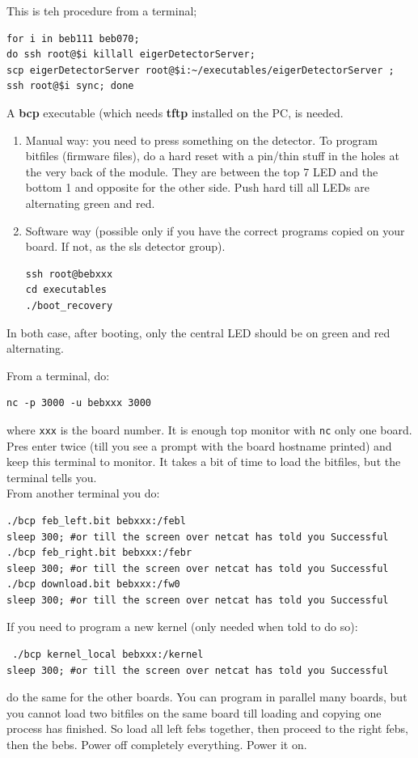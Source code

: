 \documentclass{article}
\begin{document}
This is teh procedure from a terminal;
\begin{verbatim}
for i in beb111 beb070; 
do ssh root@$i killall eigerDetectorServer; 
scp eigerDetectorServer root@$i:~/executables/eigerDetectorServer ; 
ssh root@$i sync; done
\end{verbatim}

A \textbf{bcp} executable (which needs \textbf{tftp} installed on the PC, is needed. 
\begin{enumerate}
\item Manual way: you need to press something on the detector. To program bitfiles (firmware files), do a hard reset with a pin/thin stuff in the holes at the very back of the module. They are between the top 7 LED and the bottom 1 and opposite for the other side. Push hard till all LEDs are alternating green and red.
\item Software way (possible only if you have the correct programs copied on your board. If not, as the sls detector group). 
\begin{verbatim}
ssh root@bebxxx
cd executables
./boot_recovery 
 \end{verbatim} 
\end{enumerate}
In both case, after booting, only the central LED should be on green and red alternating. 

From a terminal, do:
\begin{verbatim}
nc -p 3000 -u bebxxx 3000 
\end{verbatim} 
where {\tt{xxx}} is the board number. It is enough top monitor with {\tt{nc}} only one board. Pres enter twice (till you see a prompt with the board hostname printed) and keep this terminal to monitor. It takes a bit of time to load the bitfiles, but the terminal tells you.\\
From another terminal you do:
\begin{verbatim}
./bcp feb_left.bit bebxxx:/febl
sleep 300; #or till the screen over netcat has told you Successful
./bcp feb_right.bit bebxxx:/febr
sleep 300; #or till the screen over netcat has told you Successful
./bcp download.bit bebxxx:/fw0
sleep 300; #or till the screen over netcat has told you Successful
\end{verbatim}
If you need to program a new kernel (only needed when told to do so):
\begin{verbatim}
 ./bcp kernel_local bebxxx:/kernel
sleep 300; #or till the screen over netcat has told you Successful
\end{verbatim}
do the same for the other boards. You can program in parallel many boards, but you cannot load two bitfiles on the same board till loading and copying one process has finished. So load all left febs together, then proceed to the right febs, then the bebs. Power off completely everything. Power it on.
\end{document}
